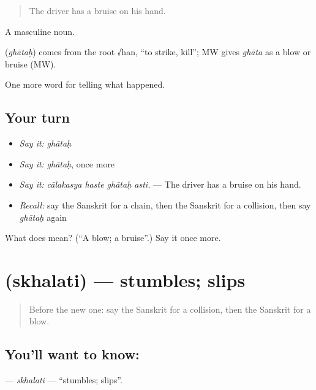 \begin{quote}
The driver has a bruise on his hand.
\end{quote}

A masculine noun.

\begin{cousinweb}
\textbf{} (\emph{ghātaḥ}) comes from the root √han, \textquotedblleft{}to strike, kill\textquotedblright{}; MW gives \emph{ghāta} as a blow or bruise (MW).
\end{cousinweb}

\begin{grammarlens}[title={What you've built}]
One more word for telling what happened.
\end{grammarlens}

\subsection*{Your turn}
\begin{itemize}
\raggedright
  \item \emph{Say it:} \emph{ghātaḥ}
  \item \emph{Say it:} \emph{ghātaḥ}, once more
  \item \emph{Say it:} \emph{cālakasya haste ghātaḥ asti.} — The driver has a bruise on his hand.
  \item \emph{Recall:} say the Sanskrit for a chain, then the Sanskrit for a collision, then say \emph{ghātaḥ} again
\end{itemize}

\begin{tcolorbox}[breakable,colback=teal!4,colframe=teal!35!black,title={Before you move on}]
What does  mean? (\textquotedblleft{}A blow; a bruise\textquotedblright{}.) Say it once more.
\end{tcolorbox}
\section[\texorpdfstring{\sk{स्खलति} (skhalati)}{स्खलति (skhalati)}]{ (skhalati) — stumbles; slips}

\label{lesson:SA-C294-skhalati}



\begin{quote}
Before the new one: say the Sanskrit for a collision, then the Sanskrit for a blow.
\end{quote}

\subsection*{You'll want to know: }
\textbf{} — \emph{skhalati} — \textquotedblleft{}stumbles; slips\textquotedblright{}.

